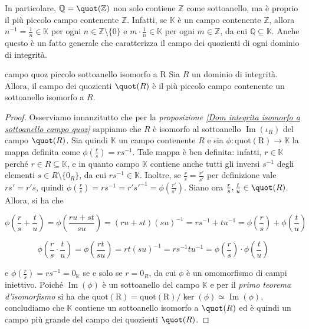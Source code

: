 \begin{obs} 
  In particolare, $\mathbb{Q}=\quot(\mathbb{Z})$ non solo contiene $\mathbb{Z}$ come sottoanello, 
  ma è proprio il più piccolo campo contenente $\mathbb{Z}$. Infatti, se $\mathbb{K}$ è un campo contenente $\mathbb{Z}$, 
  allora $n^{-1}=\frac{1}{n}\in \mathbb{K}$ per ogni $n\in \mathbb{Z}\setminus\{0\}$ e $m\cdot \frac{1}{n}\in \mathbb{K}$ 
  per ogni $m\in \mathbb{Z}$, da cui $\mathbb{Q}\subseteq \mathbb{K}$. Anche questo è un fatto generale che caratterizza 
  il campo dei quozienti di ogni dominio di integrità.
\end{obs}

\begin{prop}[1.7.5]{campo quoz piccolo sottoanello isomorfo a R}
  Sia $R$ un dominio di integrità. Allora, il campo dei quozienti $\quot(R)$ è il più piccolo campo contenente un sottoanello isomorfo a $R$.
\end{prop}
\vspace{-4mm}
\begin{proof}
  Osserviamo innanzitutto che per la \emph{proposizione \ref{Dom integrita isomorfo a sottoanello campo quoz}} sappiamo che $R$ è isomorfo al sottoanello 
  $\operatorname{Im}(\iota_R)$ del campo $\quot(R)$. Sia quindi $\mathbb{K}$ un campo contenente $R$ e sia 
  $\phi\colon \operatorname{quot(R)}\to \mathbb{K}$ la mappa definita come $\phi(\frac{r}{s})=rs^{-1}$. 
  Tale mappa è ben definita: infatti, $r\in \mathbb{K}$ perché $r\in R\subseteq \mathbb{K}$, e in quanto campo $\mathbb{K}$ contiene 
  anche tutti gli inversi $s^{-1}$ degli elementi $s\in R\setminus\{0_R\}$, da cui $rs^{-1}\in \mathbb{K}$. 
  Inoltre, se $\frac{r}{s}=\frac{r'}{s'}$ per definizione vale $rs'=r's$, quindi $\phi(\frac{r}{s})=rs^{-1}=r's'^{-1}=\phi(\frac{r'}{s'})$. 
  Siano ora $\frac{r}{s}, \frac{t}{u}\in \quot(R)$. Allora, si ha che 
  
  \[\phi\left(\frac{r}{s}+\frac{t}{u}\right)=\phi\left(\frac{ru+st}{su}\right)=(ru+st)(su)^{-1}=rs^{-1}+tu^{-1}=
  \phi\left(\frac{r}{s}\right)+\phi\left(\frac{t}{u}\right)\] 
  
  \[\phi\left(\frac{r}{s}\cdot \frac{t}{u}\right)=\phi\left(\frac{rt}{su}\right)=rt(su)^{-1}=rs^{-1}tu^{-1}=
  \phi\left(\frac{r}{s}\right)\cdot \phi\left(\frac{t}{u}\right)\] 
  
  \noindent e $\phi(\frac{r}{s})=rs^{-1}=0_{\mathbb{K}}$ se e solo se $r=0_R$, da cui $\phi$ è un omomorfismo di campi iniettivo. 
  Poiché $\operatorname{Im}(\phi)$ è un sottoanello del campo $\mathbb{K}$ e per il \emph{primo teorema d'isomorfismo} si ha che 
  $\operatorname{quot(R)}=\operatorname{quot(R)}/\ker(\phi)\simeq \operatorname{Im}(\phi)$, concludiamo che $\mathbb{K}$ 
  contiene un sottoanello isomorfo a $\quot(R)$ ed è quindi un campo più grande del campo dei quozienti $\quot(R)$. 
\end{proof}

